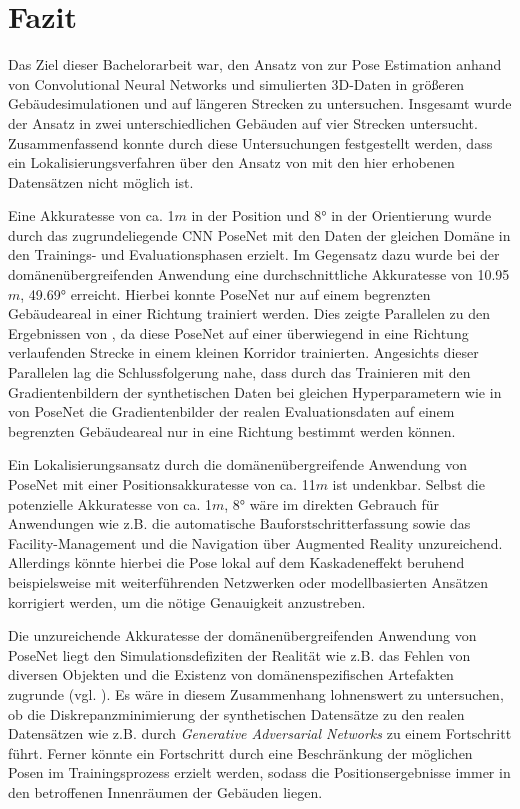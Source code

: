 
\section{Fazit}
\label{sec:kapitel_6}
Das Ziel dieser Bachelorarbeit war, den Ansatz von \citet{acharyaBIMPoseNetIndoorCamera2019} zur Pose Estimation anhand von Convolutional Neural Networks und simulierten 3D-Daten in größeren Gebäudesimulationen und auf längeren Strecken zu untersuchen.
Insgesamt wurde der Ansatz in zwei unterschiedlichen Gebäuden auf vier Strecken untersucht. Zusammenfassend konnte durch diese Untersuchungen festgestellt werden, dass ein Lokalisierungsverfahren über den Ansatz von \citet{acharyaBIMPoseNetIndoorCamera2019} mit den hier erhobenen Datensätzen nicht möglich ist.


Eine Akkuratesse von ca. 1$m$ in der Position und 8° in der Orientierung wurde durch das zugrundeliegende CNN PoseNet mit den Daten der gleichen Domäne in den Trainings- und Evaluationsphasen erzielt. Im Gegensatz dazu wurde bei der domänenübergreifenden Anwendung eine durchschnittliche Akkuratesse von 10.95$m$, 49.69° erreicht. Hierbei konnte PoseNet nur auf einem begrenzten Gebäudeareal in einer Richtung trainiert werden. Dies zeigte Parallelen zu den Ergebnissen von \citet{acharyaBIMPoseNetIndoorCamera2019}, da diese PoseNet auf einer überwiegend in eine Richtung verlaufenden Strecke in einem kleinen Korridor trainierten. Angesichts dieser Parallelen lag die Schlussfolgerung nahe, dass durch das Trainieren mit den Gradientenbildern der synthetischen Daten bei gleichen Hyperparametern wie in \cite{acharyaBIMPoseNetIndoorCamera2019} von PoseNet die Gradientenbilder der realen Evaluationsdaten auf einem begrenzten Gebäudeareal nur in eine Richtung bestimmt werden können.

Ein Lokalisierungsansatz durch die domänenübergreifende Anwendung von PoseNet mit einer Positionsakkuratesse von ca. 11$m$ ist undenkbar. Selbst die potenzielle Akkuratesse von ca. 1$m$, 8° wäre im direkten Gebrauch für Anwendungen wie z.B. die automatische Bauforstschritterfassung sowie das Facility-Manage\-ment und die Navigation über Augmented Reality unzureichend. Allerdings könnte hierbei die Pose lokal auf dem Kaskadeneffekt beruhend beispielsweise mit weiterführenden Netzwerken oder modellbasierten Ansätzen korrigiert werden, um die nötige Genauigkeit anzustreben.

Die unzureichende Akkuratesse der domänenübergreifenden Anwendung von PoseNet liegt den Simulationsdefiziten der Realität wie z.B. das Fehlen von diversen Objekten und die Existenz von domänenspezifischen Artefakten zugrunde (vgl. \cite{acharyaBIMPoseNetIndoorCamera2019}). Es wäre in diesem Zusammenhang lohnenswert zu untersuchen, ob die Diskrepanzminimierung der synthetischen Datensätze zu den realen Datensätzen wie z.B. durch \textit{Generative Adversarial Networks} zu einem Fortschritt führt. Ferner könnte ein Fortschritt durch eine Beschränkung der möglichen Posen im Trainingsprozess erzielt werden, sodass die Positionsergebnisse immer in den betroffenen Innenräumen der Gebäuden liegen.
